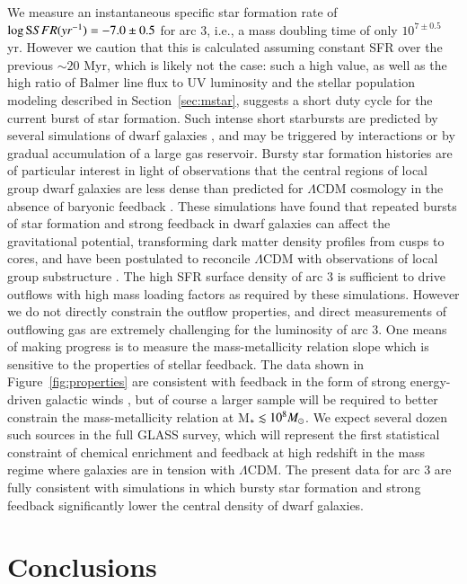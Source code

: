 We measure an instantaneous specific star formation rate of $\log{\rm SSFR (yr^{-1})} = -7.0 \pm 0.5$ for arc 3,
i.e., a mass doubling time of only $10^{7\pm0.5}$ yr. However we caution that this is calculated assuming
constant SFR over the previous $\sim20$ Myr, which is likely not the case: such a high value, as well as the high
ratio of Balmer line flux to UV luminosity and the stellar population modeling described in
Section~\ref{sec:mstar}, suggests a short duty cycle for the current burst of star formation.  Such intense short
starbursts are predicted by several simulations of dwarf galaxies
\citep[e.g.,][]{Governato2012,Zolotov2012,Brooks2014,Shen2014}, and may be triggered by interactions or by
gradual accumulation of a large gas reservoir. Bursty star formation histories are of particular interest in
light of observations that the central regions of local group dwarf galaxies are less dense than predicted for
$\Lambda$CDM cosmology in the absence of baryonic feedback \citep[the "too big to fail"
problem;][]{Boylan-Kolchin2011}. These simulations have found that repeated bursts of star formation and strong
feedback in dwarf galaxies can affect the gravitational potential, transforming dark matter density profiles from
cusps to cores, and have been postulated to reconcile $\Lambda$CDM with observations of local group substructure
\citep[although see also][]{Garrison-Kimmel2013}.  The high SFR surface density of arc 3 is sufficient to drive
outflows with high mass loading factors \citep{Newman2012} as required by these simulations. However we do not
directly constrain the outflow properties, and direct measurements of outflowing gas are extremely challenging
for the luminosity of arc 3. One means of making progress is to measure the mass-metallicity relation slope which
is sensitive to the properties of stellar feedback. The data shown in Figure~\ref{fig:properties} are consistent
with feedback in the form of strong energy-driven galactic winds \citep{Henry2013}, but of course a larger sample
will be required to better constrain the mass-metallicity relation at M$_*\lesssim10^8 \Msun$. We expect several
dozen such sources in the full GLASS survey, which will represent the first statistical constraint of chemical
enrichment and feedback at high redshift in the mass regime where galaxies are in tension with $\Lambda$CDM. The
present data for arc 3 are fully consistent with simulations in which bursty star formation and strong feedback
significantly lower the central density of dwarf galaxies.


\section{Conclusions}\label{sec:conclusions}

